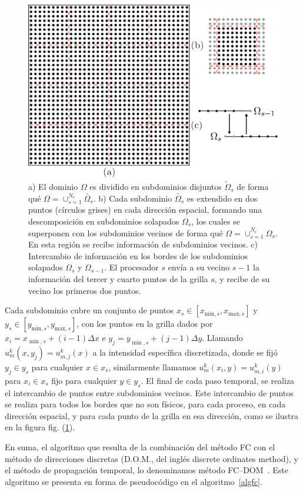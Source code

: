  \begin{figure}[h!]
  \centering
  \includegraphics[width=0.6\linewidth]{figuras/all.png}
  \caption{a) El dominio $\Omega$ es dividido en subdominios disjuntos $\widetilde{\Omega}_s$ de forma qué 
   $\Omega=\cup_{s=1}^{N_{c}}\widetilde{\Omega_s}$.
   b) Cada subdominio $\widetilde{\Omega_s}$ es extendido  
  en dos puntos (círculos grises) en cada dirección espacial, formando una descomposición en subdominios solapados $\Omega_s$, los cuales se superponen con los subdominios vecinos 
  de forma qué $\Omega=\cup_{s=1}^{N_{c}}\Omega_s$. 
  En esta región se recibe información de subdominios vecinos.
   c) Intercambio de información en los bordes de los subdominios solapados 
    $\Omega_s$ y $\Omega_{s-1}$. El 
   procesador $s$ envía a su vecino $s-1$ la información del tercer y cuarto puntos de la grilla $s$, y recibe de su vecino los primeros dos puntos.}
 \label{fig:bechange}
\end{figure}

 Cada subdominio cubre un conjunto de puntos  $x_s\in[x_{\text{min},s},x_{\text{max},s}]$ 
 y $y_s\in [y_{\text{min},s},y_{\text{max},s}]$, con los puntos 
 en la grilla dados por $x_i=x_{\min,s}+(i-1)\Delta x$ e $y_j=y_{\min,s}+(j-1)\Delta y$. 
 Llamando  $u_{m}^k(x,y_j)=u_{m,j}^k(x)$ a la intensidad específica discretizada,
  donde se fijó $y_j\in y_s$ para cualquier $x\in x_s$, similarmente llamamos $u_{m}^k(x_i,y)=u_{m,i}^k(y)$ 
  para $x_i\in x_s$ fijo para cualquier $y\in y_s$. El final de cada paso temporal, 
 se realiza el intercambio de puntos entre subdominios vecinos. 
 Este intercambio de puntos se realiza para todos los bordes que no son físicos, 
 para cada proceso, en cada dirección espacial, y para cada punto de la grilla 
 en esa dirección, como se ilustra en la figura fig. (\ref{fig:bechange}).

En suma, el algoritmo que resulta de la combinación del método FC con 
el método de direcciones discretas (D.O.M., del inglés discrete ordinates method), y el método de propagación temporal, 
lo denominamos método FC--DOM~\cite{Gaggioli2019}. Este algoritmo se 
presenta en forma de pseudocódigo en el algoritmo~\eqref{algfc}.


